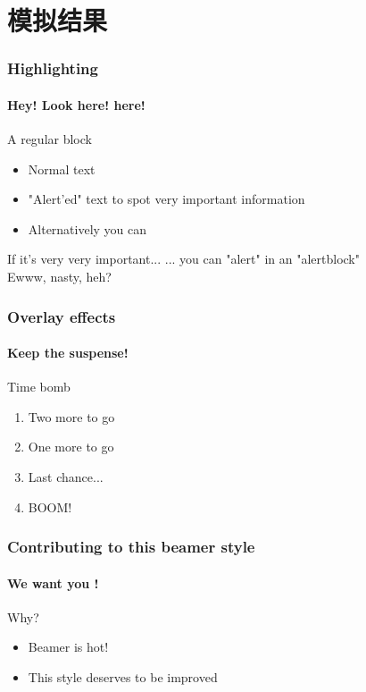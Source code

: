 \documentclass[aspectratio=43,11pt,unknownkeysallowed,UTF8]{beamer}
\begin{document}
\section{模拟结果}
\begin{frame}
  \frametitle{Highlighting}
  \framesubtitle{Hey! Look here! here!}

  \begin{block}{A regular block}
  \begin{itemize}
    \item Normal text
    \item \alert{"Alert'ed" text} to spot very important information
    \item Alternatively you can
  \end{itemize}
  \end{block}
  \begin{alertblock}{If it's very very important...}
  \alert{... you can "alert" in an "alertblock"}\\
  Ewww, nasty, heh?
  \end{alertblock}
\end{frame}


\begin{frame}
  \frametitle{Overlay effects}
  \framesubtitle{Keep the suspense!}
  \begin{block}{Time bomb}
  \begin{enumerate}
    \item<2-> Two more to go
    \item<3-> One more to go
    \item<4-> Last chance...
    \item<5-> BOOM!
  \end{enumerate}
  \end{block}
\end{frame}



\begin{frame}
  \frametitle{Contributing to this beamer style}
  \framesubtitle{We want you !}

  \begin{block}{Why?}
  \begin{itemize}
    \item Beamer is hot!
    \item This style deserves to be improved
  \end{itemize}
  \end{block}
\end{frame}
\end{document}
